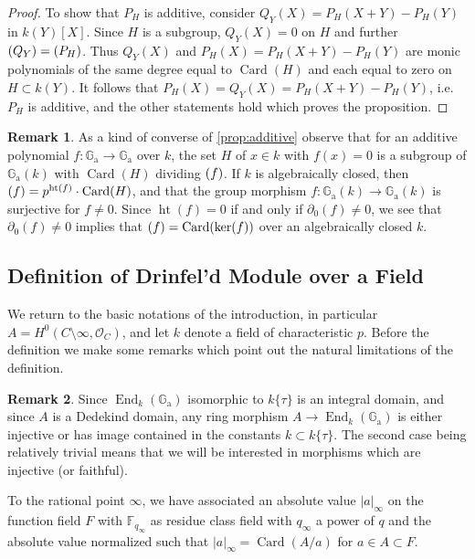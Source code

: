 \documentclass[12pt,a4paper]{article}
\theoremstyle{plain}
\theoremstyle{definition}
\newtheorem{remark}{Remark}[section]
\theoremstyle{remark}
\DeclareMathOperator{\End}{End}
\DeclareMathOperator{\Card}{Card}
\DeclareMathOperator{\htop}{ht}
\newcommand{\bF}{\mathbb{F}}
\newcommand{\cO}{\mathcal{O}}
\newcommand{\Ga}{\mathbb{G}_\mathrm{a}}
\let\deg\relax
\providecommand{\Ga}{\mathbb{G}_{\mathrm a}}
\providecommand{\cO}{\mathcal{O}}
\providecommand{\End}{\operatorname{End}}
\begin{document}
\begin{proof}
To show that $P_H$ is additive, consider $Q_Y(X) = P_H(X+Y) - P_H(Y)$ in $k(Y)[X]$. Since $H$ is a subgroup, $Q_Y(X) = 0$ on $H$ and further $\deg(Q_Y) = \deg(P_H)$. Thus $Q_Y(X)$ and $P_H(X) = P_H(X+Y) - P_H(Y)$ are monic polynomials of the same degree equal to $\Card(H)$ and each equal to zero on $H \subset k(Y)$. It follows that $P_H(X) = Q_Y(X) = P_H(X+Y) - P_H(Y)$, i.e. $P_H$ is additive, and the other statements hold which proves the proposition.
\end{proof}

\begin{remark}
\label{rem:converse}
As a kind of converse of \eqref{prop:additive} observe that for an additive polynomial $f: \Ga \to \Ga$ over $k$, the set $H$ of $x \in k$ with $f(x) = 0$ is a subgroup of $\Ga(k)$ with $\Card(H)$ dividing $\deg(f)$. If $k$ is algebraically closed, then $\deg(f) = p^{\htop(f)} \cdot \Card(H)$, and that the group morphism $f: \Ga(k) \to \Ga(k)$ is surjective for $f \neq 0$. Since $\htop(f) = 0$ if and only if $\partial_0(f) \neq 0$, we see that $\partial_0(f) \neq 0$ implies that $\deg(f) = \Card(\ker(f))$ over an algebraically closed $k$.
\end{remark}

\subsection{Definition of Drinfel'd Module over a Field}
\label{sec:definition}

We return to the basic notations of the introduction, in particular $A = H^0(C \setminus \infty, \cO_C)$, and let $k$ denote a field of characteristic $p$. Before the definition we make some remarks which point out the natural limitations of the definition.

\begin{remark}
\label{rem:integral}
Since $\End_k(\Ga)$ isomorphic to $k\{\tau\}$ is an integral domain, and since $A$ is a Dedekind domain, any ring morphism $A \to \End_k(\Ga)$ is either injective or has image contained in the constants $k \subset k\{\tau\}$. The second case being relatively trivial means that we will be interested in morphisms which are injective (or faithful).
\end{remark}

To the rational point $\infty$, we have associated an absolute value $|a|_\infty$ on the function field $F$ with $\bF_{q_\infty}$ as residue class field with $q_\infty$ a power of $q$ and the absolute value normalized such that $|a|_\infty = \Card(A/a)$ for $a \in A \subset F$.
\end{document}
